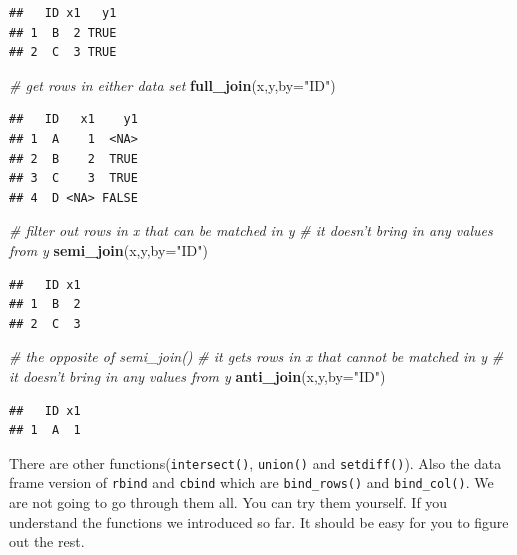 \documentclass[]{book}
\newenvironment{Shaded}{\begin{snugshade}}{\end{snugshade}}
\newcommand{\KeywordTok}[1]{\textcolor[rgb]{0.13,0.29,0.53}{\textbf{{#1}}}}
\newcommand{\DataTypeTok}[1]{\textcolor[rgb]{0.13,0.29,0.53}{{#1}}}
\newcommand{\StringTok}[1]{\textcolor[rgb]{0.31,0.60,0.02}{{#1}}}
\newcommand{\CommentTok}[1]{\textcolor[rgb]{0.56,0.35,0.01}{\textit{{#1}}}}
\newcommand{\NormalTok}[1]{{#1}}
\theoremstyle{definition}
\theoremstyle{definition}
\theoremstyle{remark}
\begin{document}
\begin{verbatim}
##   ID x1   y1
## 1  B  2 TRUE
## 2  C  3 TRUE
\end{verbatim}

\begin{Shaded}
\begin{Highlighting}[]
\CommentTok{# get rows in either data set}
\KeywordTok{full_join}\NormalTok{(x,y,}\DataTypeTok{by=}\StringTok{"ID"}\NormalTok{)}
\end{Highlighting}
\end{Shaded}

\begin{verbatim}
##   ID   x1    y1
## 1  A    1  <NA>
## 2  B    2  TRUE
## 3  C    3  TRUE
## 4  D <NA> FALSE
\end{verbatim}

\begin{Shaded}
\begin{Highlighting}[]
\CommentTok{# filter out rows in x that can be matched in y }
\CommentTok{# it doesn't bring in any values from y }
\KeywordTok{semi_join}\NormalTok{(x,y,}\DataTypeTok{by=}\StringTok{"ID"}\NormalTok{)}
\end{Highlighting}
\end{Shaded}

\begin{verbatim}
##   ID x1
## 1  B  2
## 2  C  3
\end{verbatim}

\begin{Shaded}
\begin{Highlighting}[]
\CommentTok{# the opposite of  semi_join()}
\CommentTok{# it gets rows in x that cannot be matched in y}
\CommentTok{# it doesn't bring in any values from y}
\KeywordTok{anti_join}\NormalTok{(x,y,}\DataTypeTok{by=}\StringTok{"ID"}\NormalTok{)}
\end{Highlighting}
\end{Shaded}

\begin{verbatim}
##   ID x1
## 1  A  1
\end{verbatim}

There are other functions(\texttt{intersect()}, \texttt{union()} and
\texttt{setdiff()}). Also the data frame version of \texttt{rbind} and
\texttt{cbind} which are \texttt{bind\_rows()} and \texttt{bind\_col()}.
We are not going to go through them all. You can try them yourself. If
you understand the functions we introduced so far. It should be easy for
you to figure out the rest.
\end{document}
